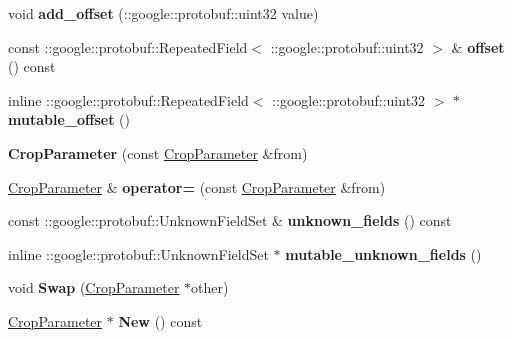 \begin{DoxyCompactItemize}
void {\bfseries add\+\_\+offset} (\+::google\+::protobuf\+::uint32 value)
\item 
\mbox{\label{classcaffe_1_1_crop_parameter_a715603fc9589b87b87058a8a25f785b1}} 
const \+::google\+::protobuf\+::\+Repeated\+Field$<$ \+::google\+::protobuf\+::uint32 $>$ \& {\bfseries offset} () const
\item 
\mbox{\label{classcaffe_1_1_crop_parameter_acd1e1be1d33e34fa2a7cd8f56b6555af}} 
inline \+::google\+::protobuf\+::\+Repeated\+Field$<$ \+::google\+::protobuf\+::uint32 $>$ $\ast$ {\bfseries mutable\+\_\+offset} ()
\item 
\mbox{\label{classcaffe_1_1_crop_parameter_a11fc893be153e72c143e3e7066b209b5}} 
{\bfseries Crop\+Parameter} (const \mbox{\hyperlink{classcaffe_1_1_crop_parameter}{Crop\+Parameter}} \&from)
\item 
\mbox{\label{classcaffe_1_1_crop_parameter_a3b1dac5abc6cdf5cbb4ebbe881f137c9}} 
\mbox{\hyperlink{classcaffe_1_1_crop_parameter}{Crop\+Parameter}} \& {\bfseries operator=} (const \mbox{\hyperlink{classcaffe_1_1_crop_parameter}{Crop\+Parameter}} \&from)
\item 
\mbox{\label{classcaffe_1_1_crop_parameter_ad022f0eb0d18d1b1c9e1444ca2fb0c2d}} 
const \+::google\+::protobuf\+::\+Unknown\+Field\+Set \& {\bfseries unknown\+\_\+fields} () const
\item 
\mbox{\label{classcaffe_1_1_crop_parameter_a3bcbdd29340afb6ca4f7ba46cf59b922}} 
inline \+::google\+::protobuf\+::\+Unknown\+Field\+Set $\ast$ {\bfseries mutable\+\_\+unknown\+\_\+fields} ()
\item 
\mbox{\label{classcaffe_1_1_crop_parameter_a796f89822c3a44a2d855135a255be66f}} 
void {\bfseries Swap} (\mbox{\hyperlink{classcaffe_1_1_crop_parameter}{Crop\+Parameter}} $\ast$other)
\item 
\mbox{\label{classcaffe_1_1_crop_parameter_a1f6cc7d5377f5122c1312695c2e71e5c}} 
\mbox{\hyperlink{classcaffe_1_1_crop_parameter}{Crop\+Parameter}} $\ast$ {\bfseries New} () const

\end{DoxyCompactItemize}
